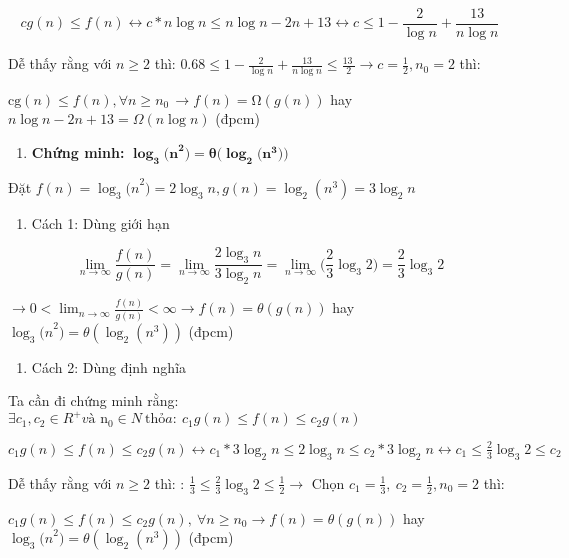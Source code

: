 \documentclass[
]{article}
\begin{document}
\[cg(n) \leq f(n) \leftrightarrow c*n\log n \leq n\log n - 2n + 13 \leftrightarrow c \leq 1 - \frac{2}{\log n} + \frac{13}{n\log n}\]

Dễ thấy rằng với \(n \geq 2\) thì:
\(0.68 \leq 1 - \frac{2}{\log n} + \frac{13}{n\log n} \leq \frac{13\ }{2} \rightarrow c = \frac{1}{2},n_{0} = 2\)
thì:

\(\text{cg}(n) \leq f(n),\forall n \geq n_{0\ } \rightarrow f(n) = \text{Ω}\left( g(n) \right)\)
hay \(n\log n - 2n + 13 = \Omega(n\log n)\) (đpcm)

\begin{enumerate}
\item
  \textbf{Chứng minh:}
  \(\mathbf{\log}_{\mathbf{3}}{\mathbf{(n}^{\mathbf{2}}\mathbf{)}}\mathbf{= \theta(}\mathbf{\log}_{\mathbf{2}}{\mathbf{(}\mathbf{n}^{\mathbf{3}}\mathbf{)}}\mathbf{)}\)
\end{enumerate}

Đặt
\(f(n) = \log_{3}{{(n}^{2}) = 2\log_{3}n},g(n) = \log_{2}{(n^{3}) = 3\log_{2}n}\)

\begin{enumerate}
\item
  Cách 1: Dùng giới hạn
\end{enumerate}

\[\lim_{n \rightarrow \infty}\frac{f(n)}{g(n)} = \lim_{n \rightarrow \infty}\frac{2\log_{3}n}{3\log_{2}n} = \lim_{n \rightarrow \infty}(\frac{2}{3}\log_{3}{2)} = \frac{2}{3}\log_{3}2\]

\(\rightarrow 0 < \lim_{n \rightarrow \infty}\frac{f(n)}{g(n)} < \infty \rightarrow f(n) = \theta(g(n))\)
hay \(\log_{3}{{(n}^{2})} = \theta(\log_{2}{(n^{3})})\) (đpcm)

\begin{enumerate}
\item
  Cách 2: Dùng định nghĩa
\end{enumerate}

Ta cần đi chứng minh rằng:
\(\exists c_{1},c_{2} \in R^{+}và\text{\ n}_{0} \in N\ \text{th}ỏa:\ c_{1}g(n) \leq f(n) \leq c_{2}g(n)\)

\(c_{1}g(n) \leq f(n) \leq c_{2}g(n) \leftrightarrow c_{1}*3\log_{2}n \leq 2\log_{3}n \leq c_{2}*3\log_{2}n \leftrightarrow c_{1} \leq \frac{2}{3}\log_{3}2 \leq c_{2}\)

Dễ thấy rằng với \(n \geq 2\) thì: :
\(\frac{1}{3} \leq \frac{2}{3}\log_{3}2 \leq \frac{1}{2} \rightarrow\)
Chọn \(c_{1} = \frac{1}{3},\ c_{2} = \frac{1}{2},n_{0} = 2\) thì:

\(c_{1}g(n) \leq f(n) \leq c_{2}g(n),\ \forall n \geq n_{0} \rightarrow f(n) = \theta(g(n))\)
hay \(\log_{3}{{(n}^{2})} = \theta(\log_{2}{(n^{3})})\) (đpcm)
\end{document}
